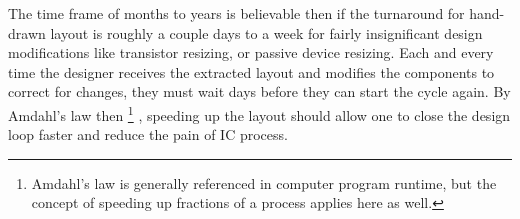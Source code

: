 The time frame of months to years is believable then if the turnaround for hand-drawn layout is roughly a couple days to a week for fairly insignificant design modifications like transistor resizing, or passive device resizing. Each and every time the designer receives the extracted layout and modifies the components to correct for changes, they must wait days before they can start the cycle again. By Amdahl's law then \footnote{Amdahl's law is generally referenced in computer program runtime, but the concept of speeding up fractions of a process applies here as well.} \cite{noauthor_amdahls_nodate}, speeding up the layout should allow one to close the design loop faster and reduce the pain of IC process.
